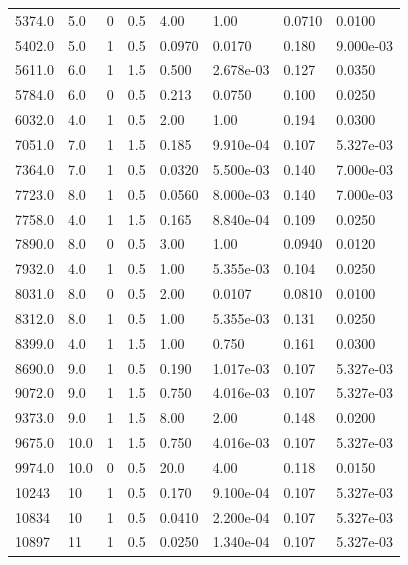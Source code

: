 \documentclass[preview]{standalone}
\begin{document}
{{\begin{tabular}{L{1.2cm}C{1.2cm} C{0.3cm}C{0.5cm} C{1.4cm}C{1.4cm} C{1.4cm}C{1.4cm}}
  5374.0  &   5.0  & 0     & 0.5 &  4.00  & 1.00  & 0.0710 &  0.0100   \\ 
  5402.0  &   5.0  & 1     & 0.5 &  0.0970  & 0.0170  & 0.180 &  9.000e-03   \\ 
  5611.0  &   6.0  & 1     & 1.5 &  0.500  & 2.678e-03  & 0.127 &  0.0350   \\ 
  5784.0  &   6.0  & 0     & 0.5 &  0.213  & 0.0750  & 0.100 &  0.0250   \\ 
  6032.0  &   4.0  & 1     & 0.5 &  2.00  & 1.00  & 0.194 &  0.0300   \\ 
  7051.0  &   7.0  & 1     & 1.5 &  0.185  & 9.910e-04  & 0.107 &  5.327e-03   \\ 
  7364.0  &   7.0  & 1     & 0.5 &  0.0320  & 5.500e-03  & 0.140 &  7.000e-03   \\ 
  7723.0  &   8.0  & 1     & 0.5 &  0.0560  & 8.000e-03  & 0.140 &  7.000e-03   \\ 
  7758.0  &   4.0  & 1     & 1.5 &  0.165  & 8.840e-04  & 0.109 &  0.0250   \\ 
  7890.0  &   8.0  & 0     & 0.5 &  3.00  & 1.00  & 0.0940 &  0.0120   \\ 
  7932.0  &   4.0  & 1     & 0.5 &  1.00  & 5.355e-03  & 0.104 &  0.0250   \\ 
  8031.0  &   8.0  & 0     & 0.5 &  2.00  & 0.0107  & 0.0810 &  0.0100   \\ 
  8312.0  &   8.0  & 1     & 0.5 &  1.00  & 5.355e-03  & 0.131 &  0.0250   \\ 
  8399.0  &   4.0  & 1     & 1.5 &  1.00  & 0.750  & 0.161 &  0.0300   \\ 
  8690.0  &   9.0  & 1     & 0.5 &  0.190  & 1.017e-03  & 0.107 &  5.327e-03   \\ 
  9072.0  &   9.0  & 1     & 1.5 &  0.750  & 4.016e-03  & 0.107 &  5.327e-03   \\ 
  9373.0  &   9.0  & 1     & 1.5 &  8.00  & 2.00  & 0.148 &  0.0200   \\ 
  9675.0  &  10.0  & 1     & 1.5 &  0.750  & 4.016e-03  & 0.107 &  5.327e-03   \\ 
  9974.0  &  10.0  & 0     & 0.5 &  20.0  & 4.00  & 0.118 &  0.0150   \\ 
  10243  &    10  & 1     & 0.5 &  0.170  & 9.100e-04  & 0.107 &  5.327e-03   \\ 
  10834  &    10  & 1     & 0.5 &  0.0410  & 2.200e-04  & 0.107 &  5.327e-03   \\ 
  10897  &    11  & 1     & 0.5 &  0.0250  & 1.340e-04  & 0.107 &  5.327e-03   \\ 

\end{tabular}}}
\end{document}
